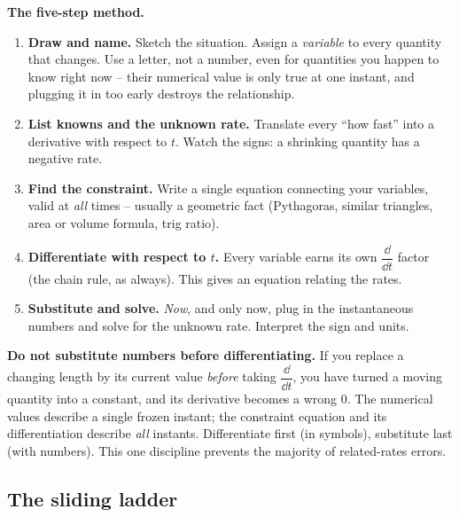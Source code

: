 \begin{focusbox}
\textbf{The five-step method.}
\begin{enumerate}
\item \textbf{Draw and name.} Sketch the situation. Assign a \emph{variable} to every quantity that
changes. Use a letter, not a number, even for quantities you happen to know right now -- their
numerical value is only true at one instant, and plugging it in too early destroys the relationship.
\item \textbf{List knowns and the unknown rate.} Translate every ``how fast'' into a derivative with
respect to $t$. Watch the signs: a shrinking quantity has a negative rate.
\item \textbf{Find the constraint.} Write a single equation connecting your variables, valid at
\emph{all} times -- usually a geometric fact (Pythagoras, similar triangles, area or volume formula,
trig ratio).
\item \textbf{Differentiate with respect to $t$.} Every variable earns its own $\dfrac{\dd}{\dd t}$
factor (the chain rule, as always). This gives an equation relating the rates.
\item \textbf{Substitute and solve.} \emph{Now}, and only now, plug in the instantaneous numbers and
solve for the unknown rate. Interpret the sign and units.
\end{enumerate}
\end{focusbox}

\begin{trapbox}
\textbf{Do not substitute numbers before differentiating.} If you replace a changing length by its
current value \emph{before} taking $\dfrac{\dd}{\dd t}$, you have turned a moving quantity into a
constant, and its derivative becomes a wrong $0$. The numerical values describe a single frozen
instant; the constraint equation and its differentiation describe \emph{all} instants. Differentiate
first (in symbols), substitute last (with numbers). This one discipline prevents the majority of
related-rates errors.
\end{trapbox}

\subsection{The sliding ladder}

